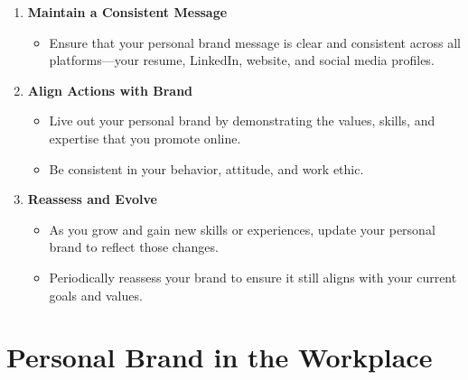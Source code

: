 \documentclass[
  letterpaper,
  DIV=11,
  numbers=noendperiod]{scrreprt}
\providecommand{\tightlist}{%
  \setlength{\itemsep}{0pt}\setlength{\parskip}{0pt}}\usepackage{longtable,booktabs,array}
\begin{document}
\begin{enumerate}
\def\labelenumi{\arabic{enumi}.}
\item
  \textbf{Maintain a Consistent Message}

  \begin{itemize}
  \tightlist
  \item
    Ensure that your personal brand message is clear and consistent
    across all platforms---your resume, LinkedIn, website, and social
    media profiles.
  \end{itemize}
\item
  \textbf{Align Actions with Brand}

  \begin{itemize}
  \tightlist
  \item
    Live out your personal brand by demonstrating the values, skills,
    and expertise that you promote online.
  \item
    Be consistent in your behavior, attitude, and work ethic.
  \end{itemize}
\item
  \textbf{Reassess and Evolve}

  \begin{itemize}
  \tightlist
  \item
    As you grow and gain new skills or experiences, update your personal
    brand to reflect those changes.
  \item
    Periodically reassess your brand to ensure it still aligns with your
    current goals and values.
  \end{itemize}
\end{enumerate}

\section{Personal Brand in the
Workplace}\label{personal-brand-in-the-workplace}
\end{document}
